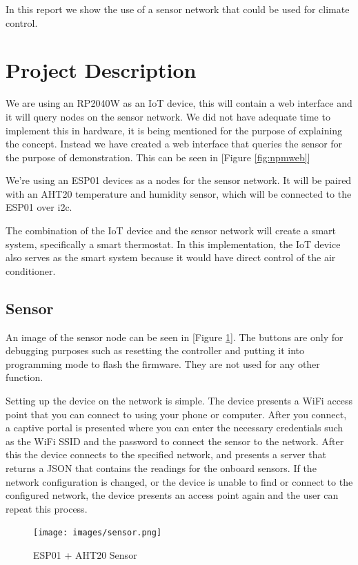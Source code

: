\documentclass[10pt, journal]{IEEEtran} %
\begin{document}
In this report we show the use of a sensor network that could be used for climate control.

\section{Project Description}

We are using an RP2040W as an IoT device, this will contain a web interface and it will
query nodes on the sensor network.
We did not have adequate time to implement this in hardware,
it is being mentioned for the purpose of explaining the concept.
Instead we have created a web interface that queries the sensor for the purpose of demonstration.
This can be seen in [Figure \ref{fig:npmweb}]

We're using an ESP01 devices as a nodes for the sensor network.
It will be paired with an AHT20 temperature and humidity sensor, 
which will be connected to the ESP01 over i2c.

The combination of the IoT device and the sensor network will create a smart system, specifically a smart thermostat.
In this implementation, 
the IoT device also serves as the smart system because it would have direct control of the air conditioner.

\subsection{Sensor}

An image of the sensor node can be seen in [Figure \ref{fig:sensor}].
The buttons are only for debugging purposes such as resetting the controller 
and putting it into programming mode to flash the firmware.
They are not used for any other function.

Setting up the device on the network is simple.
The device presents a WiFi access point that you can connect to using your phone or computer.
After you connect, a captive portal is presented where you can enter the necessary credentials 
such as the WiFi SSID and the password to connect the sensor to the network.
After this the device connects to the specified network,
and presents a server that returns a JSON that contains the readings for the onboard sensors.
If the network configuration is changed, or the device is unable to find or connect to the configured network,
the device presents an access point again and the user can repeat this process.

\begin{figure}[htbp]
    \centering
    \texttt{[image: images/sensor.png]}
    \caption{ESP01 + AHT20 Sensor}
    \label{fig:sensor}
\end{figure}
\end{document}
